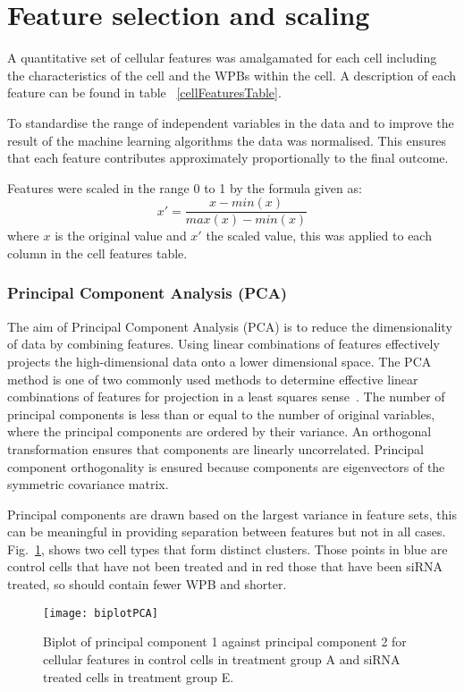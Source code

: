 \section{Feature selection and scaling}
A quantitative set of cellular features was amalgamated for each cell including the characteristics of the cell and the WPBs within the cell. A description of each feature can be found in table ~\ref{cellFeaturesTable}.

To standardise the range of independent variables in the data and to improve the result of the machine learning algorithms the data was normalised. This ensures that each feature contributes approximately proportionally to the final outcome.

Features were scaled in the range 0 to 1 by the formula given as:
\begin{equation}
	x' = \frac{x-min(x)}{max(x)-min(x)}
	\label{eq:normalisation}
\end{equation}
where $x$ is the original value and $x'$ the scaled value, this was applied to each column in the cell features table.

\subsubsection{Principal Component Analysis (PCA)}
The aim of Principal Component Analysis (PCA) is to reduce the dimensionality of data by combining features. Using linear combinations of features effectively projects the high-dimensional data onto a lower dimensional space. The PCA method is one of two commonly used methods to determine effective linear combinations of features for projection in a least squares sense~\cite{Duda2000}. The number of principal components is less than or equal to the number of original variables, where the principal components are ordered by their variance. An orthogonal transformation ensures that components are linearly uncorrelated. Principal component orthogonality is ensured because components are eigenvectors of the symmetric covariance matrix.

Principal components are drawn based on the largest variance in feature sets, this can be meaningful in providing separation between features but not in all cases. Fig.~\ref{fig:PCAbiplot}, shows two cell types that form distinct clusters. Those points in blue are control cells that have not been treated and in red those that have been siRNA treated, so should contain fewer WPB and shorter. 

\begin{figure}[!htbp]
	\texttt{[image: biplotPCA]} 
	\caption{Biplot of principal component 1 against principal component 2 for cellular features in control cells in treatment group A and siRNA treated cells in treatment group E.}
	\label{fig:PCAbiplot} 
\end{figure} 


